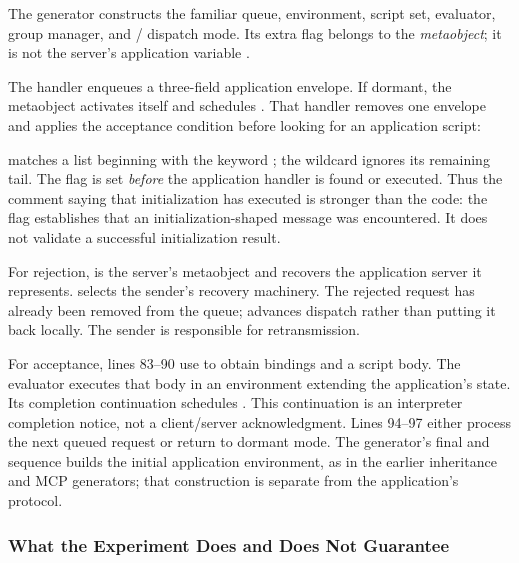 The generator constructs the familiar queue, environment, script set,
evaluator, group manager, and / dispatch mode.
Its extra  flag belongs to the \emph{metaobject};
it is not the server's application variable .


The  handler enqueues a three-field application envelope.
If dormant, the metaobject activates itself and schedules .
That handler removes one envelope and applies the acceptance condition
before looking for an application script:


\code{[:initialize . \_]} matches a list beginning with the keyword
; the wildcard ignores its remaining tail. The flag is
set \emph{before} the application handler is found or executed. Thus the
comment saying that initialization has executed is stronger than the code:
the flag establishes that an initialization-shaped message was encountered.
It does not validate a successful initialization result.

For rejection,  is the server's metaobject and \code{[den Me]}
recovers the application server it represents. 
selects the sender's recovery machinery. The rejected request has already
been removed from the queue;  advances dispatch rather than
putting it back locally. The sender is responsible for retransmission.

For acceptance, lines 83--90 use  to obtain bindings and
a script body. The evaluator executes that body in an environment extending
the application's state. Its completion continuation schedules .
This continuation is an interpreter completion notice, not a client/server
acknowledgment. Lines 94--97 either process the next queued request or return
to dormant mode. The generator's final  and 
sequence builds the initial application environment, as in the earlier
inheritance and MCP generators; that construction is separate from the
application's \code{[:initialize]} protocol.

\subsubsection{What the Experiment Does and Does Not Guarantee}


